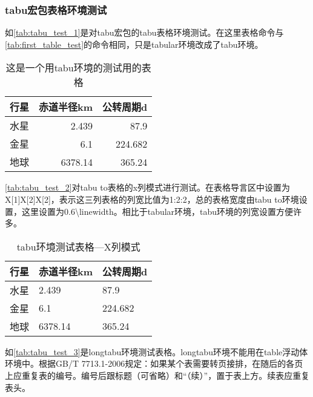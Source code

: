 \subsubsection{tabu宏包表格环境测试}
如\autoref{tab:tabu_test_1}是对tabu宏包的tabu表格环境测试。在这里表格命令与\autoref{tab:first_table_test}的命令相同，只是tabular环境改成了tabu环境。
\begin{table}[htbp]
	\centering
	\caption{这是一个用tabu环境的测试用的表格}\label{tab:tabu_test_1}
    \begin{tabu}{lrr}
    \toprule
    \textbf{行星}     & \textbf{赤道半径}km & \textbf{公转周期}d \\
    \midrule
    水星     & 2.439  & 87.9 \\
    金星     & 6.1    & 224.682 \\
    地球     & 6378.14 & 365.24 \\
    \bottomrule
    \end{tabu}%
\end{table}

\autoref{tab:tabu_test_2}对tabu to表格的x列模式进行测试。在表格导言区中设置为X[1]X[2]X[2]，表示这三列表格的列宽比值为1:2:2，总的表格宽度由tabu to环境设置，这里设置为0.6\textbackslash linewidth。相比于tabular环境，tabu环境的列宽设置方便许多。
\begin{table}[htbp]
	\centering
	\caption{tabu环境测试表格---X列模式}\label{tab:tabu_test_2}
    \begin{tabu} to 0.6\linewidth{X[1]X[2]X[2]}
    \toprule
    \textbf{行星}     & \textbf{赤道半径}km & \textbf{公转周期}d \\
    \midrule
    水星     & 2.439  & 87.9 \\
    金星     & 6.1    & 224.682 \\
    地球     & 6378.14 & 365.24 \\
    \bottomrule
    \end{tabu}%
\end{table}

如\autoref{tab:tabu_test_3}是longtabu环境测试表格。longtabu环境不能用在table浮动体环境中。根据GB/T 7713.1-2006规定：如果某个表需要转页接排，在随后的各页上应重复表的编号。编号后跟标题（可省略）和“（续）”，置于表上方。续表应重复表头。

